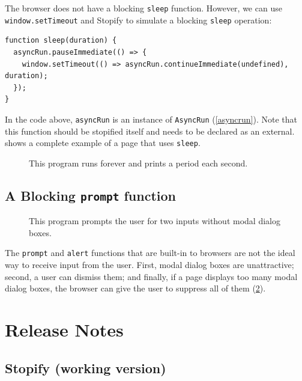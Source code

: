 \documentclass[10pt]{book}
\begin{document}
The browser does not have a blocking \lstinline|sleep| function.
However, we can use \lstinline|window.setTimeout| and Stopify to simulate
a blocking \lstinline|sleep| operation:
\begin{lstlisting}
function sleep(duration) {
  asyncRun.pauseImmediate(() => {
    window.setTimeout(() => asyncRun.continueImmediate(undefined), duration);
  });
}
\end{lstlisting}

In the code above, \lstinline|asyncRun| is an instance of \lstinline|AsyncRun|
(\cref{asyncrun}). Note that this function should be stopified itself and
needs to be declared as an external.  shows a complete example
of a page that uses \lstinline|sleep|.

\begin{figure}

\caption{This program runs forever and prints a period each second.}
\label{sleep-complete}
\end{figure}

\section{A Blocking \texttt{prompt} function}

\begin{figure}

\caption{This program prompts the user for two inputs without modal dialog boxes.}
\label{prompt-complete}
\end{figure}

The \lstinline|prompt| and \lstinline|alert| functions that are built-in to
browsers are not the ideal way to receive input from the user. First, modal
dialog boxes are unattractive; second, a user can dismiss them; and finally, if
a page displays too many modal dialog boxes, the browser can give the user to
suppress all of them (\cref{prompt-complete}).

\appendix

\chapter{Release Notes}

\section{Stopify (working version)}
\end{document}
